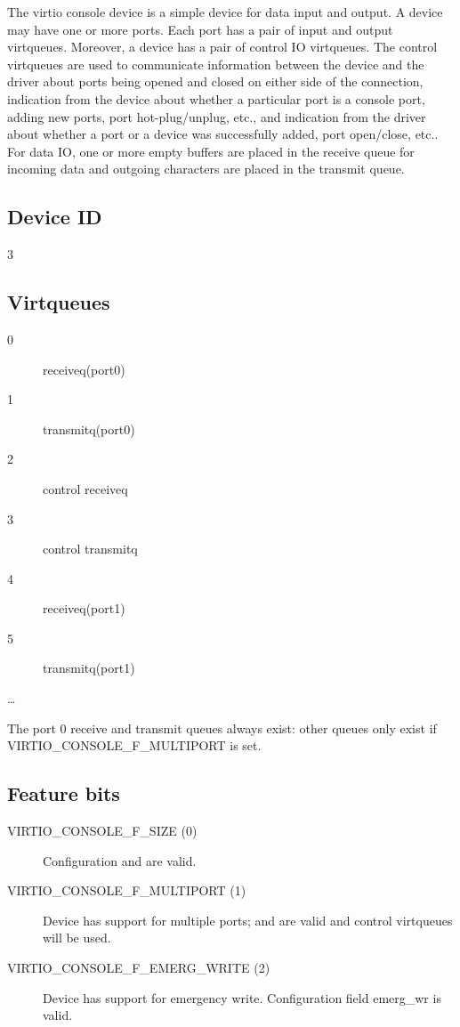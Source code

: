 The virtio console device is a simple device for data input and
output. A device may have one or more ports. Each port has a pair
of input and output virtqueues. Moreover, a device has a pair of
control IO virtqueues. The control virtqueues are used to
communicate information between the device and the driver about
ports being opened and closed on either side of the connection,
indication from the device about whether a particular port is a
console port, adding new ports, port hot-plug/unplug, etc., and
indication from the driver about whether a port or a device was
successfully added, port open/close, etc.. For data IO, one or
more empty buffers are placed in the receive queue for incoming
data and outgoing characters are placed in the transmit queue.

\subsection{Device ID}\label{sec:Device Types / Console Device / Device ID}

  3

\subsection{Virtqueues}\label{sec:Device Types / Console Device / Virtqueues}

\begin{description}
\item[0] receiveq(port0)
\item[1] transmitq(port0)
\item[2] control receiveq
\item[3] control transmitq
\item[4] receiveq(port1)
\item[5] transmitq(port1)
\item[\ldots]
\end{description}

The port 0 receive and transmit queues always exist: other queues
only exist if VIRTIO_CONSOLE_F_MULTIPORT is set.

\subsection{Feature bits}\label{sec:Device Types / Console Device / Feature bits}

\begin{description}
\item[VIRTIO_CONSOLE_F_SIZE (0)] Configuration  and 
    are valid.

\item[VIRTIO_CONSOLE_F_MULTIPORT (1)] Device has support for multiple
    ports;  and  are
    valid and control virtqueues will be used.

\item[VIRTIO_CONSOLE_F_EMERG_WRITE (2)] Device has support for emergency write.
    Configuration field emerg_wr is valid.
\end{description}

